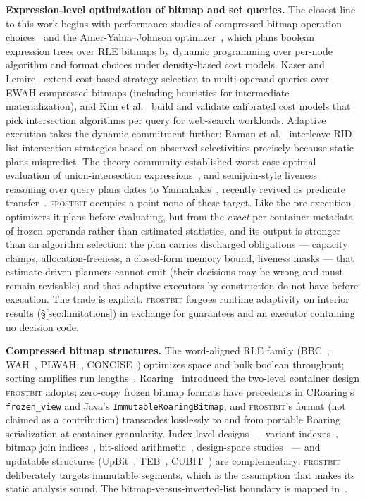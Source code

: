 \documentclass[sigconf,nonacm]{acmart}
\newcommand{\fb}{\textsc{frostbit}}
\begin{document}
\textbf{Expression-level optimization of bitmap and set queries.}
The closest line to this work begins with performance studies of
compressed-bitmap operation choices~\cite{johnson1999} and the
Amer-Yahia--Johnson optimizer~\cite{ameryahia2000}, which plans boolean
expression trees over RLE bitmaps by dynamic programming over
per-node algorithm and format choices under density-based cost models.
Kaser and Lemire~\cite{kaser2016} extend cost-based strategy selection
to multi-operand queries over EWAH-compressed bitmaps (including
heuristics for intermediate materialization), and Kim et
al.~\cite{kim2018} build and validate calibrated cost models that pick
intersection algorithms per query for web-search workloads.
Adaptive execution takes the dynamic commitment further: Raman et
al.~\cite{raman2007} interleave RID-list intersection strategies based
on observed selectivities precisely because static plans mispredict.
The theory community established worst-case-optimal evaluation of
union-intersection expressions~\cite{chiniforooshan2005,bille2007}, and
semijoin-style liveness reasoning over query plans dates to
Yannakakis~\cite{yannakakis1981}, recently revived as predicate
transfer~\cite{predtransfer2024}. \fb{} occupies a point none of these
target. Like the pre-execution optimizers it plans before evaluating,
but from the \emph{exact} per-container metadata of frozen operands
rather than estimated statistics, and its output is stronger than an
algorithm selection: the plan carries discharged obligations ---
capacity clamps, allocation-freeness, a closed-form memory bound,
liveness masks --- that estimate-driven planners cannot emit (their
decisions may be wrong and must remain revisable) and that adaptive
executors by construction do not have before execution. The trade is
explicit: \fb{} forgoes runtime adaptivity on interior results
(\S\ref{sec:limitations}) in exchange for guarantees and an executor
containing no decision code.

\textbf{Compressed bitmap structures.} The word-aligned RLE family
(BBC~\cite{antoshenkov1995}, WAH~\cite{wu2006}, PLWAH~\cite{deliege2010},
CONCISE~\cite{colantonio2010}) optimizes space and bulk boolean
throughput; sorting amplifies run lengths~\cite{lemire2010sorting}.
Roaring~\cite{chambi2016,lemire2016roaring,lemire2018} introduced the
two-level container design \fb{} adopts; zero-copy frozen bitmap
formats have precedents in CRoaring's \texttt{frozen\_view} and
Java's \texttt{ImmutableRoaringBitmap}, and \fb's format (not claimed
as a contribution) transcodes losslessly to and from portable Roaring
serialization at container granularity. Index-level designs --- variant indexes~\cite{oneil1997}, bitmap
join indices~\cite{oneil1995}, bit-sliced arithmetic~\cite{rinfret2001},
design-space studies~\cite{chan1998} --- and updatable structures
(UpBit~\cite{upbit2016}, TEB~\cite{teb2020,teb2022},
CUBIT~\cite{cubit2024}) are complementary: \fb{} deliberately targets
immutable segments, which is the assumption that makes its static
analysis sound. The bitmap-versus-inverted-list boundary is mapped
in~\cite{wang2017}.
\end{document}
